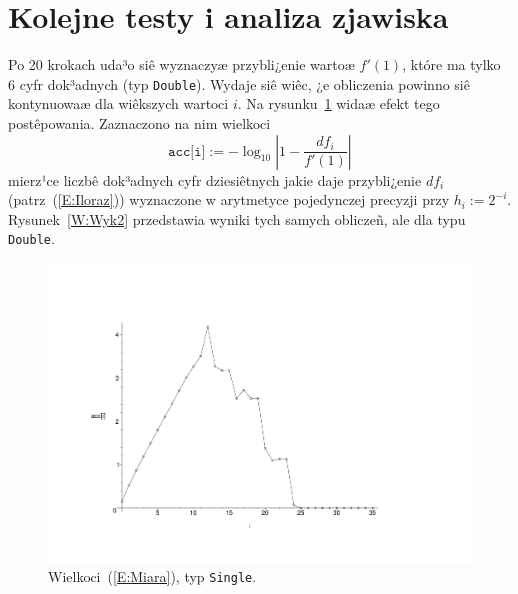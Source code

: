 \documentclass[11pt,leqno]{article}
\newcommand{\eqref}[1]{{\rm (\ref{#1})}}
\begin{document}
\section{Kolejne testy i analiza zjawiska}                       \label{S:Testy}
\setcounter{equation}{0}


Po 20 krokach uda³o siê wyznaczyæ przybli¿enie wartoæ $f'(1)$, które ma tylko
6 cyfr dok³adnych (typ \texttt{Double}). Wydaje siê wiêc, ¿e obliczenia powinno
siê kontynuowaæ dla wiêkszych wartoci $i$. Na rysunku~\ref{W:Wyk1} widaæ efekt
tego postêpowania. Zaznaczono na nim wielkoci
\begin{equation}\label{E:Miara}
\texttt{acc[i]}:=-\log_{10}\left|1-\frac{df_i}{f'(1)}\right|
\end{equation}
mierz¹ce liczbê dok³adnych cyfr dziesiêtnych jakie daje przybli¿enie $df_i$ 
(patrz~\eqref{E:Iloraz}) wyznaczone w arytmetyce pojedynczej precyzji przy
$h_i:=2^{-i}$. Rysunek~\ref{W:Wyk2} przedstawia wyniki tych samych obliczeñ, ale
dla typu \texttt{Double}.

\begin{center}
\begin{figure}[!h]
\vspace{-2cm}
\hspace{0.75cm}
\includegraphics[scale=0.5,angle=0]{wyk1.pdf}
\vspace{-2cm}
\caption{Wielkoci~\eqref{E:Miara}, typ \texttt{Single}.}\label{W:Wyk1}
\end{figure}
\end{center}
\end{document}
